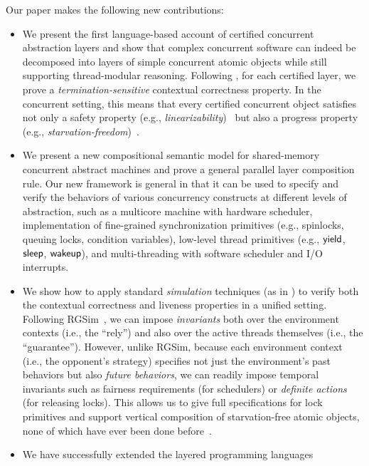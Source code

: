 Our paper makes the following new contributions:
\begin{itemize} \itemsep 0pt
\item We present the first language-based account of certified
  concurrent abstraction layers and show that complex concurrent
  software can indeed be decomposed into layers of simple concurrent
  atomic objects while still supporting thread-modular reasoning.
  Following \citet{dscal15}, for each certified layer, we prove a {\em
    termination-sensitive} contextual correctness property. In the
  concurrent setting, this means that every certified concurrent
  object satisfies not only a safety property (e.g., {\em
    linearizability})~\cite{herlihy90,filipovic10} but also a
  progress property (e.g., {\em
    starvation-freedom})~\cite{liang13,lili16}.
\item We present a new compositional semantic model for shared-memory
  concurrent abstract machines and prove a general parallel layer
  composition rule. Our new framework is general in that it can be
  used to specify and verify the behaviors of various concurrency
  constructs at different levels of abstraction, such as a multicore
  machine with hardware scheduler, implementation of fine-grained
  synchronization primitives (e.g., spinlocks, queuing locks,
  condition variables), low-level thread primitives (e.g., $\mathsf{yield}$,
  $\mathsf{sleep}$, $\mathsf{wakeup}$), and multi-threading with software scheduler and I/O
  interrupts.
\item We show how to apply standard {\em simulation} techniques
  (as in \cite{compcert,dscal15}) to verify
  both the contextual correctness and liveness properties in a unified setting.
  Following RGSim~\cite{RGSim}, we can impose
  {\em invariants} both over the environment contexts (i.e., the ``rely'')
  and also over the active threads themselves (i.e., the ``guarantee'').
  However, unlike RGSim,
  because each environment context (i.e., the opponent's strategy)
  specifies not just the environment's past behaviors
  but also {\em future behaviors}, we can readily impose temporal
  invariants such as fairness requirements (for schedulers) or
  {\em definite actions}~\cite{lili16} (for releasing locks). This allows
  us to give full specifications for lock primitives and support vertical
  composition of starvation-free atomic objects, none of which have ever
  been done before~\cite{lili16}.
\item We have successfully extended the layered programming languages

\end{itemize}
